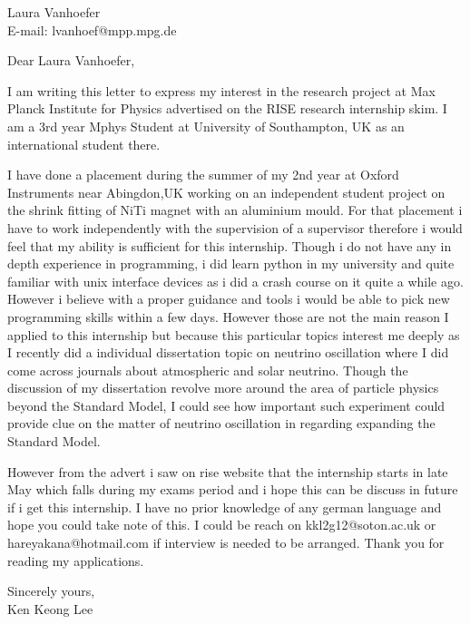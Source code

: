 \documentclass[11pt]{letter} %
\begin{document}

\begin{letter}{Laura Vanhoefer\\E-mail: lvanhoef@mpp.mpg.de}


\opening{Dear Laura Vanhoefer,} 
 
I am writing this letter to express my interest in the research project at Max Planck Institute for Physics advertised on the RISE research internship skim. I am a 3rd year Mphys Student at University of Southampton, UK as an international student there. 

I have done a placement during the summer of my 2nd year at Oxford Instruments near Abingdon,UK working on an independent student project on the shrink fitting of NiTi magnet with an aluminium mould. For that placement i have to work independently with the supervision of a supervisor therefore i would feel that my ability is sufficient for this internship. Though i do not have any in depth experience in programming, i did learn python in my university and quite familiar with unix interface devices as i did a crash course on it quite a while ago. However i believe with a proper guidance and tools i would be able to pick new programming skills within a few days. However those are not the main reason I applied to this internship but because this particular topics interest me deeply as I recently did a individual dissertation topic on neutrino oscillation where I did come across journals about atmospheric and solar neutrino. Though the discussion of my dissertation revolve more around the area of particle physics beyond the Standard Model, I could see how important such experiment could provide clue on the matter of neutrino oscillation in regarding expanding the Standard Model.
 
However from the advert i saw on rise website that the internship starts in late May which falls during my exams period and i hope this can be discuss in future if i get this internship. I have no prior knowledge of any german language and hope you could take note of this. I could be reach on kkl2g12@soton.ac.uk or hareyakana@hotmail.com if interview is needed to be arranged. Thank you for reading my applications.

\closing{Sincerely yours,\\Ken Keong Lee}




\end{letter}
\end{document}
